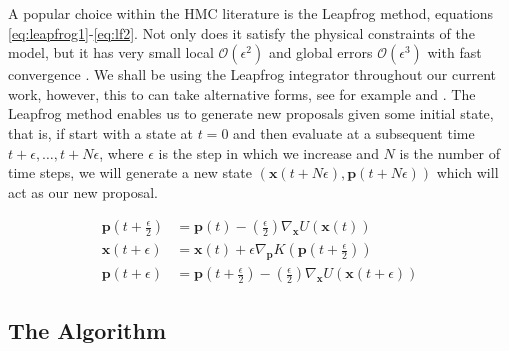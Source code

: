 \documentclass[twoside]{article}
\begin{document}
A popular choice within the HMC literature is the Leapfrog method, equations \ref{eq:leapfrog1}-\ref{eq:lf2}. Not only does it satisfy the physical constraints of the model, but it has very small local  $\mathcal{O}(\epsilon^{2})$ and global errors $\mathcal{O}(\epsilon^{3})$ with fast convergence \citep{neal2011mcmc}.  We shall be using the Leapfrog integrator throughout our current work, however, this to can take alternative forms, see for example \citep{girolami2011riemann}\citep{nishimura2017discontinuous} and \citep{blanes2012explicit}. The Leapfrog method enables us to generate new proposals given some initial state, that is, if start with a state at $t = 0$ and then evaluate at a subsequent time $t + \epsilon , \hdots, t + N\epsilon$, where $\epsilon$ is the step in which we increase and $N$ is the number of time steps, we will generate a new state $(\textbf{x}(t + N\epsilon),\textbf{p}(t + N\epsilon))$ which will act as our new proposal. 

\begin{align}
\label{eq:leapfrog1}
\textbf{p}(t + \frac{\epsilon}{2}) &= \textbf{p}(t) - \left(\frac{\epsilon}{2}\right) \nabla_\textbf{x}U(\textbf{x}(t)) \\
\textbf{x}(t + \epsilon) &= \textbf{x}(t) + \epsilon \nabla_{\textbf{p}}K(\textbf{p}(t + \frac{\epsilon}{2}))\\
\label{eq:lf2}
\textbf{p}(t + \epsilon) &= \textbf{p}(t + \frac{\epsilon}{2}) - \left(\frac{\epsilon}{2}\right)\nabla_{\textbf{x}} U(\textbf{x}(t+\epsilon))
\end{align}
\subsection{The Algorithm}
\end{document}
